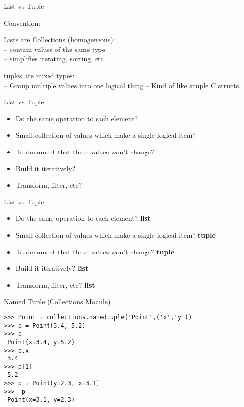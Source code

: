 \documentclass{beamer}
\begin{document}
\begin{frame}[fragile]{List vs Tuple}

\vfill
{\LARGE Convention:}

\vfill
{\Large Lists are Collections (homogeneous):\\[0.1in]
-- contain values of the same type \\ 
-- simplifies iterating, sorting, etc
}

\vfill
{\Large tuples are mixed types:\\[0.1in]
-- Group multiple values into one logical thing
-- Kind of like simple C structs.
}
\vfill

\end{frame} 

\begin{frame}[fragile]{List vs Tuple}

{\Large
\begin{itemize}
  \item Do the same operation to each element?
  \item Small collection of values which make a single logical item?
  \item To document that these values won't change?
  \item Build it iteratively?
  \item Transform, filter, etc?
\end{itemize}
}

\end{frame} 

\begin{frame}[fragile]{List vs Tuple}

{\Large
\begin{itemize}
  \item Do the same operation to each element? {\bf list}
  \item Small collection of values which make a single logical item? {\bf tuple}
  \item To document that these values won't change? {\bf tuple}
  \item Build it iteratively? {\bf list}
  \item Transform, filter, etc? {\bf list}
\end{itemize}
}

\end{frame} 

\begin{frame}[fragile]{Named Tuple (Collections Module) }

\begin{verbatim}
>>> Point = collections.namedtuple('Point',('x','y'))
>>> p = Point(3.4, 5.2)
>>> p
 Point(x=3.4, y=5.2)
>>> p.x
 3.4
>>> p[1]
 5.2
>>> p = Point(y=2.3, x=3.1)
>>>  p
 Point(x=3.1, y=2.3)
\end{verbatim}

\end{frame} 
\end{document}
